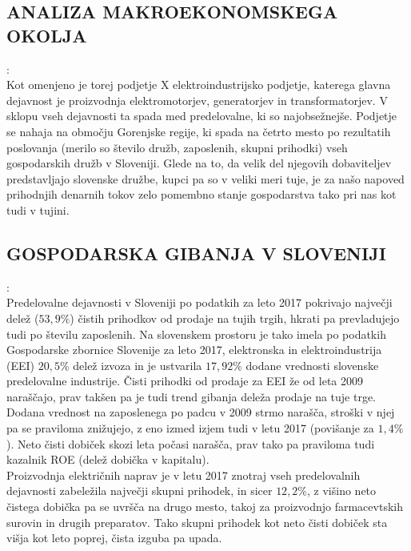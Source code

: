 \documentclass[12pt,a4paper]{amsart}
\theoremstyle{definition} %
\theoremstyle{plain} %
\begin{document}
\subsection{ANALIZA MAKROEKONOMSKEGA OKOLJA}:\\

Kot omenjeno je torej podjetje X elektroindustrijsko podjetje, katerega glavna dejavnost je proizvodnja elektromotorjev, generatorjev in transformatorjev. V sklopu vseh dejavnosti ta spada med predelovalne, ki so najobsežnejše. Podjetje se nahaja na območju Gorenjske regije, ki spada na četrto mesto po rezultatih poslovanja (merilo so število družb, zaposlenih, skupni prihodki) vseh gospodarskih družb v Sloveniji. Glede na to, da velik del njegovih dobaviteljev predstavljajo slovenske družbe, kupci pa so v veliki meri tuje, je za našo napoved prihodnjih denarnih tokov zelo pomembno stanje gospodarstva tako pri nas kot tudi v tujini.

\subsection{GOSPODARSKA GIBANJA V SLOVENIJI}:\\

Predelovalne dejavnosti v Sloveniji po podatkih za leto 2017 pokrivajo največji delež ($53,9\%$) čistih prihodkov od prodaje na tujih trgih, hkrati pa prevladujejo tudi po številu zaposlenih. 
Na slovenskem prostoru je tako imela po podatkih Gospodarske zbornice Slovenije za leto 2017, elektronska in elektroindustrija (EEI) $20,5\%$ delež izvoza in je ustvarila $17,92\%$ dodane vrednosti slovenske predelovalne industrije. Čisti prihodki od prodaje za EEI že od leta 2009 naraščajo, prav takšen pa je tudi trend gibanja deleža prodaje na tuje trge. Dodana vrednost na zaposlenega po padcu v 2009 strmo narašča, stroški v njej pa se praviloma znižujejo, z eno izmed izjem tudi v letu 2017 (povišanje za $1,4\%$). Neto čisti dobiček skozi leta počasi narašča, prav tako pa praviloma tudi kazalnik ROE (delež dobička v kapitalu).\\
Proizvodnja električnih naprav je v letu 2017 znotraj vseh predelovalnih dejavnosti zabeležila največji skupni prihodek, in sicer $12,2\%$, z višino neto čistega dobička pa se uvršča na drugo mesto, takoj za proizvodnjo farmacevtskih surovin in drugih preparatov. Tako skupni prihodek kot neto čisti dobiček sta višja kot leto poprej, čista izguba pa upada.\\
\end{document}
